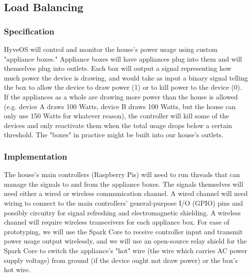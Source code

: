 \begin{multicols}{2}
	\subsection{Load Balancing}
	
	\subsubsection{Specification}
		
		HyveOS will control and monitor the house's power usage using custom "appliance boxes." Appliance boxes will have appliances plug into them and will themselves plug into outlets. Each box will output a signal representing how much power the device is drawing, and would take as input a binary signal telling the box to allow the device to draw power (1) or to kill power to the device (0). If the appliances as a whole are drawing more power than the house is allowed (e.g. device A draws 100 Watts, device B draws 100 Watts, but the house can only use 150 Watts for whatever reason), the controller will kill some of the devices and only reactivate them when the total usage drops below a certain threshold. The "boxes" in practice might be built into our house's outlets.
		
	\subsubsection{Implementation}
	
		The house's main controllers (Raspberry Pis) will need to run threads that can manage the signals to and from the appliance boxes. The signals themselves will need either a wired or wireless communication channel. A wired channel will need wiring to connect to the main controllers' general-purpose I/O (GPIO) pins and possibly circuitry for signal refreshing and electromagnetic shielding. A wireless channel will require wireless transceivers for each appliance box. For ease of prototyping, we will use the Spark Core to receive controller input and transmit power usage output wirelessly, and we will use an open-source relay shield for the Spark Core to switch the appliance's "hot" wire (the wire which carries AC power supply voltage) from ground (if the device ought not draw power) or the box's hot wire.
		
	
\end{multicols}

